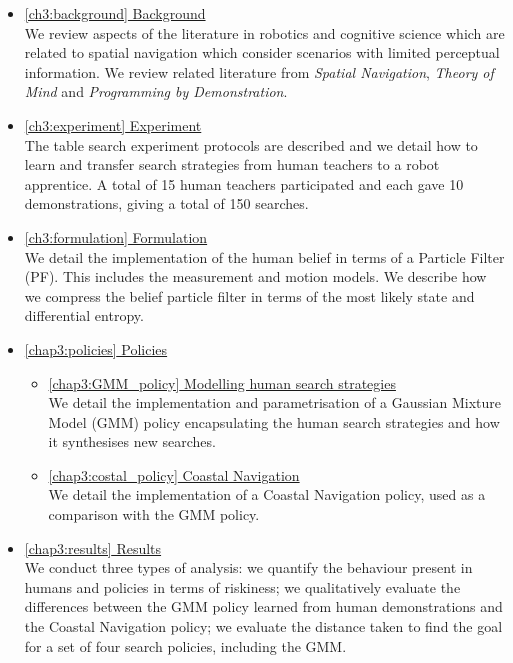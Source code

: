 \begin{itemize}

\item  \hyperref[ch3:background]{\ref{ch3:background}   Background}\\
We review aspects of the literature in robotics and cognitive science which are related to spatial navigation which 
consider scenarios with limited perceptual information. We review related literature from \textit{Spatial Navigation}, 
\textit{Theory of Mind} and \textit{Programming by Demonstration}.

\item  \hyperref[ch3:experiment]{\ref{ch3:experiment}   Experiment}\\
The table search experiment protocols are described and we detail how to learn and transfer search strategies from human teachers to a robot 
apprentice. A total of 15 human teachers participated and each gave 10 demonstrations, giving a total of 150 searches.

\item  \hyperref[ch3:formulation]{\ref{ch3:formulation}  Formulation}\\
We detail the implementation of the human belief in terms of a Particle Filter (PF). This includes the measurement and motion 
models. We describe how we compress the belief particle filter in terms of the most likely state and differential entropy.

\item  \hyperref[chap3:policies]{\ref{chap3:policies} 	Policies}
\begin{itemize}
  \item \hyperref[chap3:GMM_policy]{\ref{chap3:GMM_policy} Modelling human search strategies}\\
  We detail the implementation and parametrisation of a Gaussian Mixture Model (GMM) policy encapsulating
the human search strategies and how it synthesises new searches.
  \item \hyperref[chap3:costal_policy]{\ref{chap3:costal_policy} Coastal Navigation}\\
  We detail the implementation of a Coastal Navigation policy, used as a comparison with the GMM policy.
\end{itemize}

\item  \hyperref[chap3:results]{\ref{chap3:results} 	Results}\\
We conduct three types of analysis: we quantify the behaviour present in humans and policies in terms of riskiness; we 
qualitatively evaluate the differences between the GMM policy learned from human demonstrations and the Coastal Navigation policy;
we evaluate the distance taken to find the goal for a set of four search policies, including the GMM.

\end{itemize}
\clearpage
